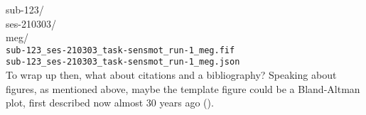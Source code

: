 \documentclass[12pt]{article} %
\newcommand\tab[1][1.5cm]{\hspace*{#1}} %
\begin{document}
{\selectfont
sub-123/ \\
\tab ses-210303/ \\
\tab \tab meg/ \\
\tab \tab \verb|sub-123_ses-210303_task-sensmot_run-1_meg.fif| \\
\tab \tab \verb|sub-123_ses-210303_task-sensmot_run-1_meg.json| 
}\\

To wrap up then, what about citations and a bibliography? Speaking about figures, as mentioned above, maybe the template figure could be a Bland-Altman plot, first described now almost 30 years ago (\cite{altman_measurement_1983}).

\break %

\printbibliography %
\end{document}
